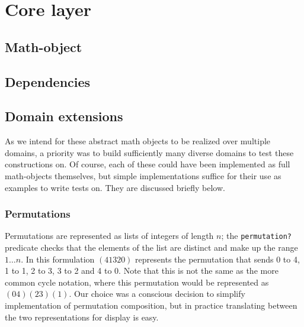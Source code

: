 \documentclass{article}
\begin{document}
    
    \section{Core layer}
        
        
        
        \subsection{Math-object}
            
            
            
        
        \subsection{Dependencies}
            
            
            
        
        \subsection{Domain extensions}
            
            As we intend for these abstract math objects to be realized over multiple domains, a priority was to build sufficiently many diverse domains to test these constructions on. Of course, each of these could have been implemented as full math-objects themselves, but simple implementations suffice for their use as examples to write tests on. They are discussed briefly below.
            
            \subsubsection{Permutations}
            \label{permutations}
				
				Permutations are represented as lists of integers of length $n$; the \texttt{permutation?} predicate checks that the elements of the list are distinct and make up the range $1 \ldots n$. In this formulation $(4 1 3 2 0)$ represents the permutation that sends 0 to 4, 1 to 1, 2 to 3, 3 to 2 and 4 to 0. Note that this is not the same as the more common cycle notation, where this permutation would be represented as $(0 4) (2 3) (1)$. Our choice was a conscious decision to simplify implementation of permutation composition, but in practice translating between the two representations for display is easy.
\end{document}
